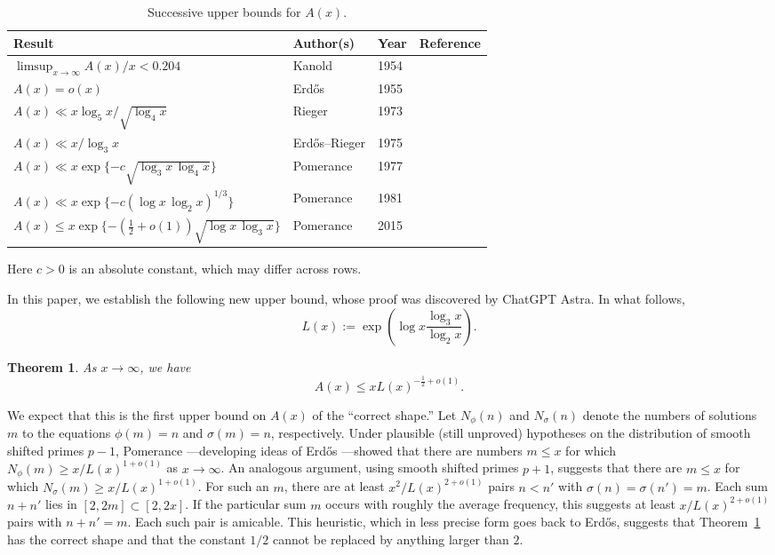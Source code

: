 \documentclass[11pt]{amsart}
\newtheorem{theorem}{Theorem}
\begin{document}
\begin{table}[!ht]
\centering
\caption{Successive upper bounds for $A(x)$.}
\label{tab:amicable-bounds}
\small
\renewcommand{\arraystretch}{1.65}
\setlength{\tabcolsep}{4pt}
\begin{tabular*}{\textwidth}{@{\extracolsep{\fill}}llll@{}}
\toprule
Result & Author(s) & Year & Reference\\
\midrule
$\limsup_{x\to\infty} A(x)/x<0.204$
 & Kanold & 1954 & \cite{Kanold1954}\\
$A(x)=o(x)$
 & Erd\H{o}s & 1955 & \cite{Erdos1955}\\
$A(x)\ll x\log_5 x/\sqrt{\log_4 x}$
 & Rieger & 1973 & \cite{Rieger1973}\\
$A(x)\ll x/\log_3 x$
 & Erd\H{o}s--Rieger & 1975 & \cite{ErdosRieger1975}\\
$A(x)\ll x\exp\{-c\sqrt{\log_3 x\,\log_4 x}\}$
 & Pomerance & 1977 & \cite{Pomerance1977}\\
$A(x)\ll x\exp\{-c(\log x\,\log_2 x)^{1/3}\}$
 & Pomerance & 1981 & \cite{Pomerance1981}\\
$A(x)\le x\exp\{-(\tfrac12+o(1))\sqrt{\log x\,\log_3 x}\}$
 & Pomerance & 2015 & \cite{Pomerance2015}\\
\bottomrule
\end{tabular*}

\smallskip
\begin{minipage}{\textwidth}
\footnotesize
Here $c>0$ is an absolute constant, which may differ across rows.
\end{minipage}
\end{table}

In this paper, we establish the following new upper bound, whose proof was discovered by ChatGPT Astra. In what follows,
\[ L(x) := \exp\left(\log{x} \frac{\log_3{x}}{\log_2{x}}\right).\]

    \begin{theorem}\label{thm:main}
    As $x\to\infty$, we have
    \[
     A(x)\le x L(x)^{-\frac{1}{2}+o(1)}.
    \]
    \end{theorem}
We expect that this is the first upper bound on $A(x)$ of the
``correct shape.'' Let $N_{\phi}(n)$ and $N_{\sigma}(n)$ denote
the numbers of solutions $m$ to the equations $\phi(m)=n$ and
$\sigma(m)=n$, respectively. Under plausible (still unproved)
hypotheses on the distribution of smooth shifted primes $p-1$,
Pomerance \cite{Pomerance1980}---developing ideas of Erd\H{o}s
\cite{Erdos1935}---showed that there are numbers $m\le x$ for which
$N_{\phi}(m)\ge x/L(x)^{1+o(1)}$ as $x\to\infty$. An analogous
argument, using smooth shifted primes $p+1$, suggests that there
are $m\le x$ for which $N_{\sigma}(m)\ge x/L(x)^{1+o(1)}$.
For such an $m$, there are at least $x^2/L(x)^{2+o(1)}$ pairs
$n<n'$ with $\sigma(n)=\sigma(n')=m$. Each sum $n+n'$ lies in
$[2,2m]\subset[2,2x]$. If the particular sum $m$ occurs with
roughly the average frequency, this suggests at least
$x/L(x)^{2+o(1)}$ pairs with $n+n'=m$. Each such pair is
amicable. This heuristic, which in less precise form goes back to Erd\H{o}s, suggests that Theorem~\ref{thm:main} has the correct shape and that the constant \(1/2\) cannot be replaced by anything larger than \(2\).
\end{document}
